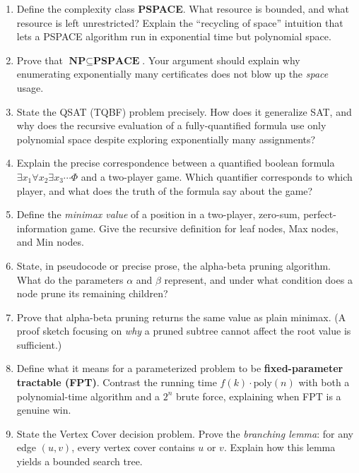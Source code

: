\documentclass[11pt]{article}
\begin{document}
\begin{enumerate}[label=\textbf{A\arabic*.}, leftmargin=2.2em]

\item Define the complexity class \textbf{PSPACE}. What resource is bounded, and
what resource is left unrestricted? Explain the ``recycling of space'' intuition
that lets a PSPACE algorithm run in exponential time but polynomial space.

\item Prove that $\textbf{NP} \subseteq \textbf{PSPACE}$. Your argument should
explain why enumerating exponentially many certificates does not blow up the
\emph{space} usage.

\item State the QSAT (TQBF) problem precisely. How does it generalize SAT, and
why does the recursive evaluation of a fully-quantified formula use only
polynomial space despite exploring exponentially many assignments?

\item Explain the precise correspondence between a quantified boolean formula
$\exists x_1 \forall x_2 \exists x_3 \cdots \Phi$ and a two-player game. Which
quantifier corresponds to which player, and what does the truth of the formula
say about the game?

\item Define the \emph{minimax value} of a position in a two-player, zero-sum,
perfect-information game. Give the recursive definition for leaf nodes, Max
nodes, and Min nodes.

\item State, in pseudocode or precise prose, the alpha-beta pruning algorithm.
What do the parameters $\alpha$ and $\beta$ represent, and under what condition
does a node prune its remaining children?

\item Prove that alpha-beta pruning returns the same value as plain minimax.
(A proof sketch focusing on \emph{why} a pruned subtree cannot affect the root
value is sufficient.)

\item Define what it means for a parameterized problem to be
\textbf{fixed-parameter tractable (FPT)}. Contrast the running time
$f(k)\cdot\mathrm{poly}(n)$ with both a polynomial-time algorithm and a
$2^n$ brute force, explaining when FPT is a genuine win.

\item State the Vertex Cover decision problem. Prove the \emph{branching lemma}:
for any edge $(u,v)$, every vertex cover contains $u$ or $v$. Explain how this
lemma yields a bounded search tree.


\end{enumerate}
\end{document}
